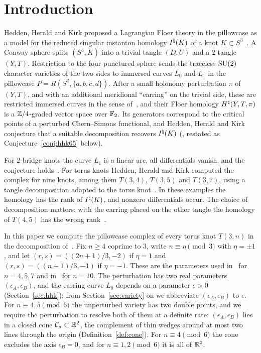\section{Introduction}\label{sec:intro}

Hedden, Herald and Kirk proposed a Lagrangian Floer theory in the pillowcase as a model for the reduced
singular instanton homology $I^{\natural}(K)$ of a knot $K\subset S^3$~\cite{HHK1,HHK2}. A Conway sphere splits
$(S^3,K)$ into a trivial tangle $(D,U)$ and a $2$-tangle $(Y,T)$. Restriction to the four-punctured sphere sends
the traceless $\mathrm{SU}(2)$ character varieties of the two sides to immersed curves $L_0$ and $L_1$ in the
pillowcase $P=R(S^2,\{a,b,c,d\})$. After a small holonomy perturbation $\pi$ of $(Y,T)$, and with an
additional meridional ``earring'' on the trivial side, these are restricted immersed curves in the sense
of~\cite{HHK2}, and their Floer homology $H^{\natural}(Y,T,\pi)$ is a $\mathbb{Z}/4$-graded vector space over $\mathbb{F}_2$. Its
generators correspond to the critical points of a perturbed Chern--Simons functional, and Hedden, Herald and
Kirk conjecture that a suitable decomposition recovers $I^{\natural}(K)$ (\cite[Conj.~6.5]{HHK2}, restated as
Conjecture~\ref{conj:hhk65} below).

For $2$-bridge knots the curve $L_1$ is a linear arc, all differentials vanish, and the conjecture
holds~\cite[\S7]{HHK2}. For torus knots Hedden, Herald and Kirk computed the complex for nine knots, among
them $T(3,4)$, $T(3,5)$ and $T(3,7)$, using a tangle decomposition adapted to the torus knot~\cite[\S\S10--11]{HHK2}.
In these examples the homology has the rank of $I^{\natural}(K)$, and nonzero differentials occur. The choice of
decomposition matters: with the earring placed on the other tangle the homology of $T(4,5)$ has the wrong
rank~\cite[\S10.3]{CHKK}.

In this paper we compute the pillowcase complex of every torus knot $T(3,n)$ in the decomposition
of~\cite[\S10]{HHK2}. Fix $n\ge4$ coprime to $3$, write $n\equiv\eta\pmod3$ with $\eta=\pm1$, and let
$(r,s)=((2n+1)/3,-2)$ if $\eta=1$ and $(r,s)=((n+1)/3,-1)$ if $\eta=-1$. These are the parameters used
in~\cite{HHK2} for $n=4,5,7$ and in~\cite{FKP} for $n=10$. The perturbation has two real parameters
$(\epsilon_A,\epsilon_B)$, and the earring curve $L_0$ depends on a parameter $\epsilon>0$
(Section~\ref{sec:hhk}); from Section~\ref{sec:variety} on we abbreviate $(\epsilon_A,\epsilon_B)$ to $\epsilon$. For $n\equiv4,5\pmod6$ the unperturbed variety has two double points, and we require
the perturbation to resolve both of them at a definite rate: $(\epsilon_A,\epsilon_B)$ lies in a closed cone
$\mathcal C_a\subset\mathbb{R}^2$, the complement of thin wedges around at most two lines through the origin
(Definition~\ref{def:cone}). For
$n\equiv4\pmod6$ the cone excludes the axis $\epsilon_B=0$, and for $n\equiv1,2\pmod6$ it is all of $\mathbb{R}^2$.

